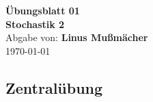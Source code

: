 \documentclass{article}
\def\sheetNumber{01}
\def\names{Linus Mußmächer}
\def\sumPoints{30}
\begin{document}
\begin{doublespace}
	\begin{center}
		\textbf{\Large{Übungsblatt \sheetNumber}}\\
		\textbf{\Large{Stochastik 2}}\\
		Abgabe von: \textbf{\names}\\
		\today
	\end{center}
\end{doublespace}




\subsection{Zentralübung}
\end{document}
